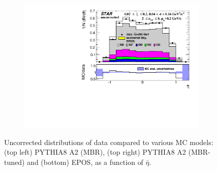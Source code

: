 \begin{figure}[h!]
\begin{subfigure}{.49\textwidth}
		\includegraphics[width=\linewidth, page=1]{chapters/chrgSTAR/img/nonSD/chrg/SDT_epos_xi0_RP_starsim_eta.pdf}
	\end{subfigure}
	\begin{minipage}{.49\textwidth}
		\caption{Uncorrected distributions of data compared to various MC models: (top left) PYTHIA8 A2 (MBR), (top right) PYTHIA8 A2 (MBR-tuned) and (bottom) EPOS, as a function of $\bar{\eta}$. }
		\label{fig:nonSDera}
	\end{minipage}
	
\end{figure}
\FloatBarrier